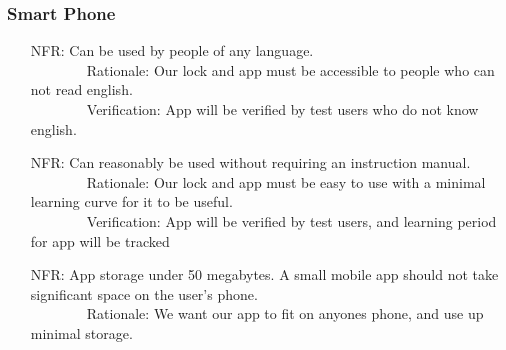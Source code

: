 \documentclass[12pt]{article}
\newcounter{nfrnum} %
\begin{document}
\subsubsection{Smart Phone}
\begin{itemize}
\setlength{\itemindent}{.5in}
\item[NFR\refstepcounter{nfrnum}\thenfrnum\label{NFR1}:] Can be used by people of any language.
\\ \-\ \-\ \-\ \-\ \-\ \-\ \-\ \-\ Rationale: Our lock and app must be accessible to people who can not read english.
\\ \-\ \-\ \-\ \-\ \-\ \-\ \-\ \-\ Verification: App will be verified by test users who do not know english.
\item[NFR\refstepcounter{nfrnum}\thenfrnum\label{NFR2}:] Can reasonably be used without requiring an instruction manual.
\\ \-\ \-\ \-\ \-\ \-\ \-\ \-\ \-\ Rationale: Our lock and app must be easy to use with a minimal learning curve for it to be useful.
\\ \-\ \-\ \-\ \-\ \-\ \-\ \-\ \-\ Verification: App will be verified by test users, and learning period for app will be tracked
\item[NFR\refstepcounter{nfrnum}\thenfrnum\label{NFR3}:] App storage under 50 megabytes. A small mobile app should not take significant space on the user's phone.
\\ \-\ \-\ \-\ \-\ \-\ \-\ \-\ \-\ Rationale: We want our app to fit on anyones phone, and use up minimal storage.
\end{itemize}
\end{document}
